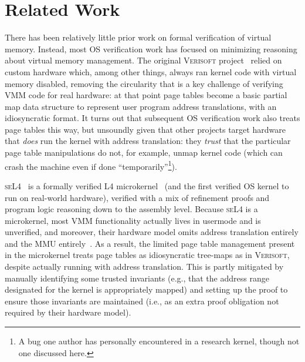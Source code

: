 \section{Related Work}
\label{sec:relwork}

There has been relatively little prior work on formal verification of virtual memory.
Instead, most OS verification work has focused on minimizing reasoning about virtual memory management.
The original \textsc{Verisoft} project~\cite{alkassar2008verisoft,alkassar2010pervasive,alkassar2008formal,dalinger2005verification,hillebrand2005address,alkassar2008formal,starostin2010formal} 
relied on custom hardware which, among other things, always ran kernel code with virtual memory disabled, removing the circularity that is a key challenge of verifying 
VMM code for real hardware: at that point page tables become a basic partial map data structure to represent user program address translations,
with an idiosyncratic format. It turns out that subsequent OS verification work also treats page tables this way, but
unsoundly given that other projects target hardware that \emph{does} run the kernel with address translation: they \emph{trust}
that the particular page table manipulations do not, for example, unmap kernel code (which can crash the machine even if done ``temporarily''\footnote{A bug
one author has personally encountered in a research kernel, though not one discussed here.}).

\textsc{seL4}~\cite{Klein2009seL4,seL4TOCS,Sewell2013translation} is a formally verified L4 microkernel~\cite{Liedtke1995,Liedtke1996} 
(and the first verified OS kernel to run on real-world hardware), verified with a mix of refinement proofs and program logic reasoning down to the assembly level.
Because \textsc{seL4} is a microkernel, most VMM functionality actually lives in usermode and is unverified, and moreover, 
their hardware model omits address translation entirely and the MMU entirely~\cite{Klein2009seL4,seL4TOCS}. 
As a result, the limited page table management present in the microkernel treats page tables as idiosyncratic tree-maps as in
\textsc{Verisoft}, despite actually running with address translation.
This is partly mitigated by manually identifying some trusted invariants (e.g., that the address range designated for the kernel is appropriately mapped)
and setting up the proof to ensure those invariants are maintained (i.e., as an extra proof obligation not required by their hardware model).

